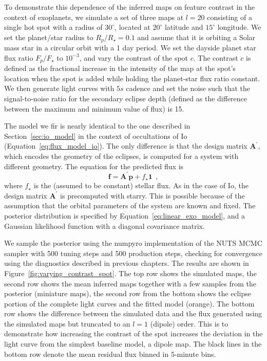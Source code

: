 \documentclass[12pt,dvipsnames]{report}
\newcommand{\ssf}[1]{\textsf{#1}}
\renewcommand{\vec}[1]{\boldsymbol{\mathbf{#1}}}
\newcommand{\hquad}{~~}
\begin{document}
To demonstrate this dependence of the inferred maps on feature contrast in the context of 
exoplanets, we simulate a set of three maps at $l=20$ consisting
of a single hot spot  with a radius of $30^\circ$, 
located at $20^\circ$ latitude and $15^\circ$ longitude.
We set the planet/star radius to $R_p/R_\star=0.1$ and assume that it is orbiting a 
Solar mass star in a circular orbit with a 1 day period. 
We set the dayside planet star flux ratio 
$F_p/F_\star$ to $10^{-3}$, and vary the contrast of the spot $c$.
The contrast $c$ is defined 
as the fractional increase in the intensity of 
the map at the spot's location when the spot is added while holding the 
planet-star flux ratio constant. We then generate light curves with $5s$
cadence and set the noise such that the signal-to-noise ratio for the secondary
eclipse depth (defined as the difference between the maximum and minimum value of flux) is 15.

The model we fir is nearly identical to the one described in 
Section~\ref{sec:io_model} in the context of occultations of Io 
(Equation~\ref{eq:flux_model_io}). The only difference is that the design matrix $\vec A^\prime$,
which encodes the geometry of the eclipses, is computed for a system with different 
geometry.
The equation for the predicted flux is 
\begin{equation}
    \vec{f} = \vec{A}^\prime\vec{p} + f_\star\vec{1}
    \hquad,
    \label{eq:linear_exo_model}
\end{equation}
where $f_\star$ is the (assumed to be constant) stellar flux.
As in the case of Io, the design matrix $\vec{A}^\prime$ is precomputed with \ssf{starry}.
This is possible because of the assumption that the orbital parameters of the system are 
known and fixed. 
The posterior distribution is specified by Equation~\ref{eq:linear_exo_model}, and 
a Gaussian likelihood function with a diagonal covariance matrix. 

We sample the posterior using the \ssf{numpyro} implementation of the NUTS MCMC sampler 
with 500 tuning steps and 500 production 
steps, checking for convergence using the diagnostics described in previous chapters. 
The results are shown in Figure~\ref{fig:varying_contrast_spot}. The top row
shows the simulated maps, the second row shows the mean inferred maps together
with a few samples from the posterior (miniature maps),  the second row from the
bottom shows the eclipse portion of the complete light curves and the fitted
model (orange). The bottom row shows the difference between the
simulated data and the flux generated using the simulated maps but truncated to an 
$l=1$ (dipole) order. This is to demonstrate how increasing the contrast of the spot 
increases the deviation in the light curve from the simplest baseline model, a dipole map. 
The black lines in the bottom row denote the mean residual flux binned in 5-minute bins.
\end{document}
